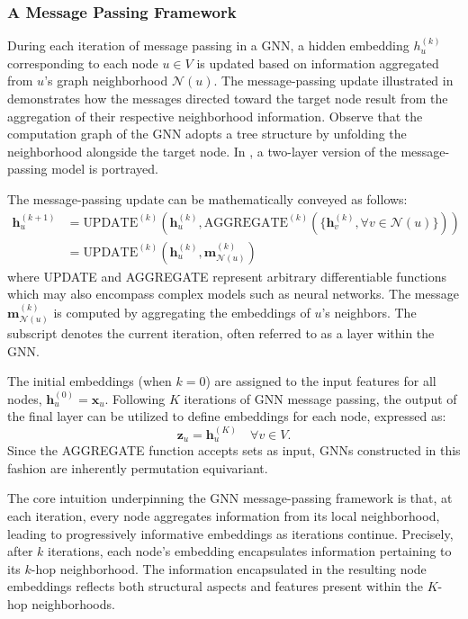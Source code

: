 \subsubsection{A Message Passing Framework}
During each iteration of message passing in a GNN, a hidden embedding $ h_u^{(k)} $ corresponding to each node $ u \in V $ is updated based on information aggregated from $ u $’s graph neighborhood $ \mathcal{N}(u) $. The message-passing update illustrated in  demonstrates how the messages directed toward the target node result from the aggregation of their respective neighborhood information. Observe that the computation graph of the GNN adopts a tree structure by unfolding the neighborhood alongside the target node. In , a two-layer version of the message-passing model is portrayed.



The message-passing update can be mathematically conveyed as follows:
\begin{align}\label{eq:GNNupdate}
    \mathbf{h}_u^{(k+1)} &= \text{UPDATE}^{(k)}\left(\mathbf{h}_u^{(k)}, \text{AGGREGATE}^{(k)}(\{\mathbf{h}_v^{(k)}, \forall v \in \mathcal{N}(u)\})\right) \\
    &= \text{UPDATE}^{(k)}\left(\mathbf{h}_u^{(k)}, \mathbf{m}_{\mathcal{N}(u)}^{(k)}\right)
\end{align}
where UPDATE and AGGREGATE represent arbitrary differentiable functions which may also encompass complex models such as neural networks. The message $ \mathbf{m}_{\mathcal{N}(u)}^{(k)} $ is computed by aggregating the embeddings of $ u $'s neighbors. The subscript denotes the current iteration, often referred to as a layer within the GNN.

The initial embeddings (when $ k=0 $) are assigned to the input features for all nodes, $ \mathbf{h}_u^{(0)} = \mathbf{x}_u $. Following $ K $ iterations of GNN message passing, the output of the final layer can be utilized to define embeddings for each node, expressed as:
\begin{equation*}
    \mathbf{z}_u=\mathbf{h}_u^{(K)} \quad \forall v \in V.
\end{equation*}
Since the AGGREGATE function accepts sets as input, GNNs constructed in this fashion are inherently permutation equivariant.

The core intuition underpinning the GNN message-passing framework is that, at each iteration, every node aggregates information from its local neighborhood, leading to progressively informative embeddings as iterations continue. Precisely, after $ k $ iterations, each node's embedding encapsulates information pertaining to its $ k $-hop neighborhood. The information encapsulated in the resulting node embeddings reflects both structural aspects and features present within the $ K $-hop neighborhoods.

